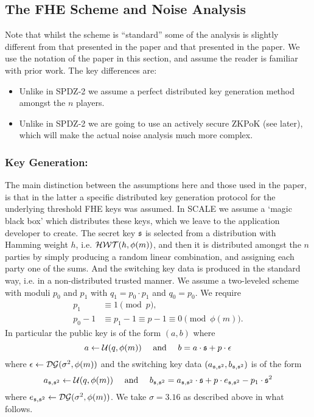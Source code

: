 \subsection{The FHE Scheme and Noise Analysis}
Note that whilst the scheme is ``standard'' some of the
analysis is slightly different from that presented in the \cite{SPDZ2} paper 
and that presented in the \cite{GHS12c} paper.
We use the notation of the \cite{SPDZ2} paper in this section,
and assume the reader is familiar with prior work.
The key differences are:
\begin{itemize}
\item Unlike in SPDZ-2 we assume a perfect distributed key generation method
amongst the $n$ players.
\item Unlike in SPDZ-2 we are going to use an actively secure ZKPoK (see later),
which will make the actual noise analysis much more complex.
\end{itemize}


\subsubsection{Key Generation:}
The main distinction between the assumptions here and those used in 
the \cite{SPDZ2} paper, is that in the latter a specific distributed 
key generation protocol for the underlying threshold FHE keys was
assumed. In SCALE we assume a `magic black box' which distributes
these keys, which we leave to the application developer to create.
The secret key $\mathfrak{s}$ is selected from a distribution with
Hamming weight $h$, i.e. $\mathcal{HWT}(h,\phi(m))$, 
and then it is distributed amongst the $n$ parties by simply producing a random 
linear combination, and assigning each party one of the sums.
And the switching key data is produced in the standard way, i.e.
in a non-distributed trusted manner.
We assume a two-leveled scheme with moduli $p_0$ and $p_1$ with $q_1=p_0 \cdot p_1$
and $q_0=p_0$.
We require 
\begin{align*}
   p_1 & \equiv 1 \pmod{p}, \\
   p_0 - 1 & \equiv p_1-1 \equiv p-1 \equiv 0 \pmod{\phi(m)}.
\end{align*}
In particular the public key is of the form $(a,b)$ where
\[ a \leftarrow \mathcal{U}(q,\phi(m)) \quad \mbox{ and } \quad b = a \cdot \mathfrak{s} + p \cdot \epsilon \]
where $\epsilon \leftarrow \mathcal{DG}(\sigma^2,\phi(m))$ 
and the switching key data $(a_{\mathfrak{s},\mathfrak{s}^2},b_{\mathfrak{s},\mathfrak{s}^2})$ is of the form
\[ a_{\mathfrak{s},\mathfrak{s}^2} \leftarrow \mathcal{U}(q,\phi(m)) \quad \mbox{ and } \quad 
   b_{\mathfrak{s},\mathfrak{s}^2} =   a_{\mathfrak{s},\mathfrak{s}^2} \cdot \mathfrak{s} + p \cdot e_{\mathfrak{s},\mathfrak{s}^2} - p_1 \cdot \mathfrak{s}^2 \]
where $e_{\mathfrak{s},\mathfrak{s}^2} \leftarrow \mathcal{DG}(\sigma^2,\phi(m))$.
We take $\sigma=3.16$ as described above in what follows.

